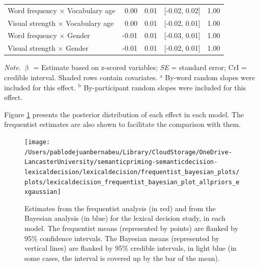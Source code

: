 \documentclass[
  12pt,
  man,floatsintext]{apa7}
\begin{document}
\begin{table}[H]
\begin{threeparttable}
\begin{tabular}[t]{lrrrr}
\hspace{1em}Word frequency  $\times$  Vocabulary age & 0.00 & 0.01 & {}[-0.02, 0.02] & 1.00\\
\hspace{1em}Visual strength  $\times$  Vocabulary age & 0.00 & 0.01 & {}[-0.02, 0.01] & 1.00\\
\hspace{1em}Word frequency  $\times$  Gender & -0.01 & 0.01 & {}[-0.03, 0.01] & 1.00\\
\hspace{1em}Visual strength  $\times$  Gender & -0.01 & 0.01 & {}[-0.02, 0.01] & 1.00\\
\bottomrule
\end{tabular}
\begin{tablenotes}
\item \textit{\linebreak} 
\item \textit{Note}. $\upbeta$ = Estimate based on z-scored variables; \textit{SE} = standard error; \linebreak \phantom{.}CrI = credible interval. Shaded rows contain covariates. \linebreak \linebreak \phantom{.}$^{\text{a}}$ By-word random slopes were included for this effect. \linebreak \phantom{.}$^{\text{b}}$ By-participant random slopes were included for this effect.
\end{tablenotes}
\end{threeparttable}
\end{table}

Figure \ref{fig:lexicaldecision-frequentist-bayesian-plot-allpriors-exgaussian} presents the posterior distribution of each effect in each model. The frequentist estimates are also shown to facilitate the comparison with them.

\begin{figure}

{\centering \texttt{[image: /Users/pablodejuanbernabeu/Library/CloudStorage/OneDrive-LancasterUniversity/semanticpriming-semanticdecision-lexicaldecision/lexicaldecision/frequentist\_bayesian\_plots/plots/lexicaldecision\_frequentist\_bayesian\_plot\_allpriors\_exgaussian]} 

}

\caption{Estimates from the frequentist analysis (in red) and from the Bayesian analysis (in blue) for the lexical decision study, in each model. The frequentist means (represented by points) are flanked by 95\% confidence intervals. The Bayesian means (represented by vertical lines) are flanked by 95\% credible intervals, in light blue (in some cases, the interval is covered up by the bar of the mean).}\label{fig:lexicaldecision-frequentist-bayesian-plot-allpriors-exgaussian}
\end{figure}

\clearpage
\end{document}
